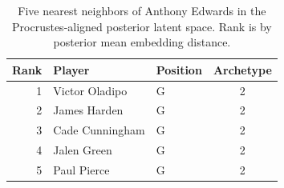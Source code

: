 \begin{table}[htbp]
  \centering\small
  \begin{tabular}{rllc}
    \toprule
    Rank & Player & Position & Archetype \\
    \midrule
    1 & Victor Oladipo & G & 2 \\
    2 & James Harden & G & 2 \\
    3 & Cade Cunningham & G & 2 \\
    4 & Jalen Green & G & 2 \\
    5 & Paul Pierce & G & 2 \\
    \bottomrule
  \end{tabular}
  \caption{Five nearest neighbors of Anthony Edwards in the Procrustes-aligned posterior latent space. Rank is by posterior mean embedding distance.}
  \label{tab:Anthony_Edwards_neighbors}
\end{table}

